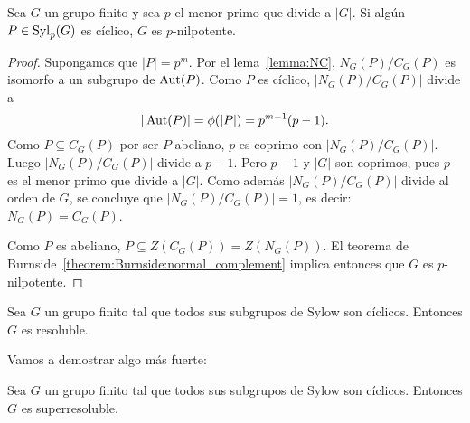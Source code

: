 \begin{corollary}
	\label{corollary:Sylow_ciclico}
	Sea $G$ un grupo finito y sea $p$ el menor primo que divide a $|G|$. Si
	algún $P\in\mathrm{Syl}_p(G)$ es cíclico, $G$ es $p$-nilpotente.
\end{corollary}

\begin{proof}
	Supongamos que $|P|=p^m$.  Por el lema~\ref{lemma:NC}, $N_G(P)/C_G(P)$ es
	isomorfo a un subgrupo de $\operatorname{Aut}(P)$. Como $P$ es cíclico, $|N_G(P)/C_G(P)|$ divide a 
	\[
		|\operatorname{Aut}(P)|=\phi(|P|)=p^{m-1}(p-1).
	\]
	Como $P\subseteq C_G(P)$ por ser $P$ abeliano, $p$ es coprimo con
	$|N_G(P)/C_G(P)|$.  Luego $|N_G(P)/C_G(P)|$ divide a $p-1$. Pero $p-1$ y
	$|G|$ son coprimos, pues $p$ es el menor primo que divide a $|G|$.  Como
	además $|N_G(P)/C_G(P)|$ divide al orden de $G$, se concluye que
	$|N_G(P)/C_G(P)|=1$, es decir: $N_G(P)=C_G(P)$. 

	Como $P$ es abeliano, $P\subseteq Z(C_G(P))=Z(N_G(P))$. El teorema de
	Burnside~\ref{theorem:Burnside:normal_complement} implica entonces que $G$
	es $p$-nilpotente. 
\end{proof}

\begin{exercise}
	Sea $G$ un grupo finito tal que todos sus subgrupos de Sylow son cíclicos.
	Entonces $G$ es resoluble.
\end{exercise}

Vamos a demostrar algo más fuerte:

\begin{corollary}
	\label{corollary:Sylow_ciclicos:resoluble}
	Sea $G$ un grupo finito tal que todos sus subgrupos de Sylow son cíclicos.
	Entonces $G$ es superresoluble.
\end{corollary}


